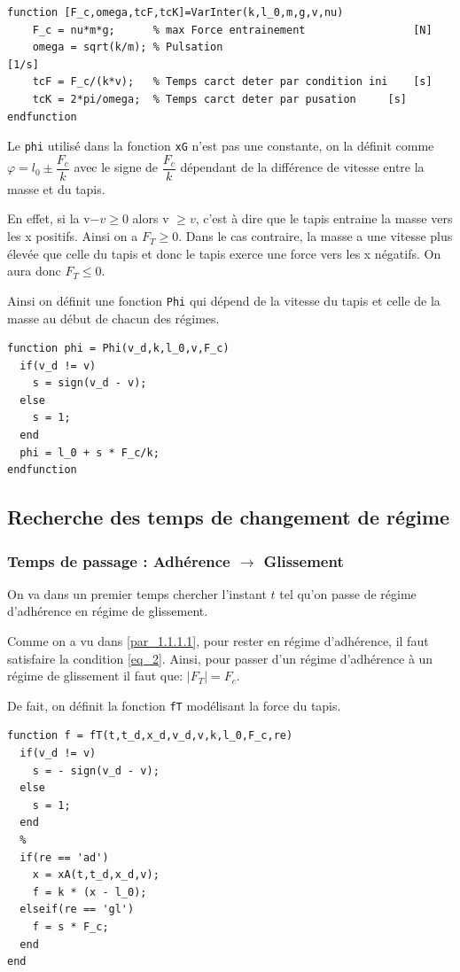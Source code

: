 \documentclass{article}
\newcommand{\ts}{\scriptscriptstyle}
\begin{document}
\begin{lstlisting}
function [F_c,omega,tcF,tcK]=VarInter(k,l_0,m,g,v,nu)
	F_c = nu*m*g;      % max Force entrainement					[N]
	omega = sqrt(k/m); % Pulsation									[1/s]
	tcF = F_c/(k*v);   % Temps carct deter par condition ini	[s]
	tcK = 2*pi/omega;  % Temps carct deter par pusation		[s]
endfunction
\end{lstlisting}

Le \verb|phi| utilisé dans la fonction \verb|xG| n'est pas une constante, on la définit comme $\varphi = l_0 \pm \dfrac{F_c}{k}$ avec le signe de $\dfrac{F_c}{k}$ dépendant de la différence de vitesse entre la masse et du tapis.

En effet, si la v$- v \geq 0$ alors v $\geq v$, c'est à dire que le tapis entraine la masse vers les x positifs. Ainsi on a $F_{\ts{T}}\geq0$. Dans le cas contraire, la masse a une vitesse plus élevée que celle du tapis et donc le tapis exerce une force vers les x négatifs. On aura donc $F_{\ts{T}}\leq0$.

Ainsi on définit une fonction \verb|Phi| qui dépend de la vitesse du tapis et celle de la masse au début de chacun des régimes.

\begin{lstlisting}
function phi = Phi(v_d,k,l_0,v,F_c)
  if(v_d != v)
    s = sign(v_d - v);
  else
    s = 1;
  end
  phi = l_0 + s * F_c/k;
endfunction
\end{lstlisting}

\subsection{Recherche des temps de changement de régime}\label{ssec_2.2}
\subsubsection{Temps de passage : Adhérence $\rightarrow$ Glissement}\label{sssec_2.2.1}
On va dans un premier temps chercher l'instant $t$ tel qu'on passe de régime d'adhérence en régime de glissement. 

Comme on a vu dans \ref{par_1.1.1.1}, pour rester en régime d'adhérence, il faut satisfaire la condition \eqref{eq_2}. Ainsi, pour passer d'un régime d'adhérence à un régime de glissement il faut que: $\mid F_{\ts{T}}\mid = F_c$.

De fait, on définit la fonction \verb|fT| modélisant la force du tapis.
\begin{lstlisting}
function f = fT(t,t_d,x_d,v_d,v,k,l_0,F_c,re)
  if(v_d != v)
    s = - sign(v_d - v);
  else
    s = 1;
  end
  %
  if(re == 'ad')
    x = xA(t,t_d,x_d,v);
    f = k * (x - l_0);
  elseif(re == 'gl')
    f = s * F_c;
  end
end
\end{lstlisting}
\end{document}
